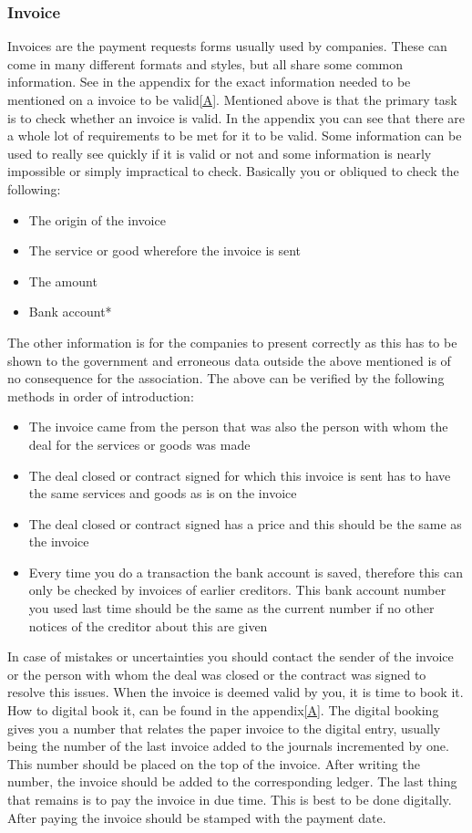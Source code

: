 \documentclass{report}
\begin{document}
\subsubsection{Invoice}
Invoices are the payment requests forms usually used by companies. These can come in many different formats and styles, but all share some common information. See in the appendix for the exact information needed to be mentioned on a invoice to be valid\ref{A}. Mentioned above is that the primary task is to check whether an invoice is valid. In the appendix you can see that there are a whole lot of requirements to be met for it to be valid. Some information can be used to really see quickly if it is valid or not and some information is nearly impossible or simply impractical to check. Basically you or obliqued to check the following:
\begin{itemize} 
	\vspace{-1mm}
	\itemsep-1mm 
	\item The origin of the invoice
	\item The service or good wherefore the invoice is sent
	\item The amount
	\item Bank account*
\end{itemize}
The other information is for the companies to present correctly as this has to be shown to the government and erroneous data outside the above mentioned is of no consequence for the association. The above can be verified by the following methods in order of introduction:
\begin{itemize} 
	\vspace{-1mm}
	\itemsep-1mm 
	\item The invoice came from the person that was also the person with whom the deal for the services or goods was made
	\item The deal closed or contract signed for which this invoice is sent has to have the same services and goods as is on the invoice
	\item The deal closed or contract signed has a price and this should be the same as the invoice
	\item Every time you do a transaction the bank account is saved, therefore this can only be checked by invoices of earlier creditors. This bank account number you used last time should be the same as the current number if no other notices of the creditor about this are given  
\end{itemize} 
In case of mistakes or uncertainties you should contact the sender of the invoice or the person with whom the deal was closed or the contract was signed to resolve this issues. When the invoice is deemed valid by you, it is time to book it. How to digital book it, can be found in the appendix\ref{A}. The digital booking gives you a number that relates the paper invoice to the digital entry, usually being the number of the last invoice added to the journals incremented by one. This number should be placed on the top of the invoice. After writing the number, the invoice should be added to the corresponding ledger. The last thing that remains is to pay the invoice in due time. This is best to be done digitally. After paying the invoice should be stamped with the payment date.
\end{document}
